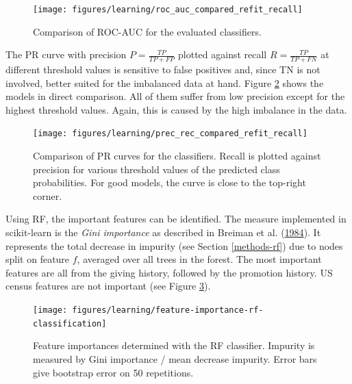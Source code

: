 \documentclass[
  11pt,
  a4paper,
  DIV=12,captions=tableheading,oneside,titlepage]{scrbook}
\begin{document}
\begin{figure}

{\centering \texttt{[image: figures/learning/roc\_auc\_compared\_refit\_recall]} 

}

\caption{Comparison of ROC-AUC for the evaluated classifiers.}\label{fig:roc-auc-curve}
\end{figure}

The PR curve with precision \(P = \frac{TP}{TP+FP}\) plotted against recall \(R = \frac{TP}{{TP+FN}}\) at different threshold values is sensitive to false positives and, since TN is not involved, better suited for the imbalanced data at hand. Figure \ref{fig:p-r-curve} shows the models in direct comparison. All of them suffer from low precision except for the highest threshold values. Again, this is caused by the high imbalance in the data.



\begin{figure}

{\centering \texttt{[image: figures/learning/prec\_rec\_compared\_refit\_recall]} 

}

\caption{Comparison of PR curves for the classifiers. Recall is plotted against precision for various threshold values of the predicted class probabilities. For good models, the curve is close to the top-right corner.}\label{fig:p-r-curve}
\end{figure}

Using RF, the important features can be identified. The measure implemented in scikit-learn is the \emph{Gini importance} as described in Breiman et al. (\protect\hyperlink{ref-breiman1984classification}{1984}). It represents the total decrease in impurity (see Section \ref{methods-rf}) due to nodes split on feature \(f\), averaged over all trees in the forest. The most important features are all from the giving history, followed by the promotion history. US census features are not important (see Figure \ref{fig:importances}).

\begin{figure}

{\centering \texttt{[image: figures/learning/feature-importance-rf-classification]} 

}

\caption{Feature importances determined with the RF classifier. Impurity is measured by Gini importance / mean decrease impurity. Error bars give bootstrap error on 50 repetitions.}\label{fig:importances}
\end{figure}
\end{document}
